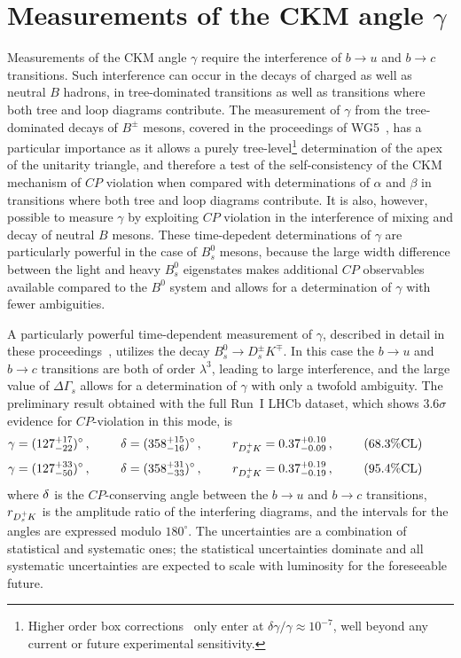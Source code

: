 \section{Measurements of the CKM angle $\gamma$}
\label{sec:gamma}
Measurements of the CKM angle $\gamma$ require the interference of $b\to u$ and $b\to c$ transitions.
Such interference can occur in the decays of charged as well as neutral $B$ hadrons, in tree-dominated
transitions as well as transitions where both tree and loop diagrams contribute.
The measurement of $\gamma$ from the tree-dominated decays of $B^\pm$ mesons, covered in the 
proceedings of WG5~\cite{WG5PROC}, has a particular importance as it allows a purely tree-level\footnote{Higher order box corrections~\cite{ZupanBrodGamma}
only enter at $\delta\gamma/\gamma \approx 10^{-7}$, well beyond any current or future experimental sensitivity.}
determination of the apex of the unitarity triangle, and therefore a test of the self-consistency of the CKM
mechanism of $CP$ violation when compared with determinations of $\alpha$ and $\beta$ in transitions where
both tree and loop diagrams contribute. It is also, however, possible to measure $\gamma$ by exploiting
$CP$ violation in the interference of mixing and decay of neutral $B$ mesons. These time-depedent determinations
of $\gamma$ are particularly powerful in the case of $B^0_s$ mesons, because the large width difference between
the light and heavy $B^0_s$ eigenstates makes additional $CP$ observables available compared
to the $B^0$ system and allows for a determination of $\gamma$ with fewer ambiguities. 

A particularly powerful time-dependent measurement of $\gamma$, described in detail in these proceedings~\cite{DSKPROC}, utilizes the decay $B^0_s \to D^\pm_s K^\mp$.
In this case the $b\to u$ and $b\to c$ transitions are both of order $\lambda^3$, leading to large interference, and
the large value of $\Delta\Gamma_s$ allows for a determination of $\gamma$ with only a twofold ambiguity. 
The preliminary result obtained with the full Run~I LHCb dataset, which shows $3.6\sigma$ evidence for $CP$-violation in this mode, is
\begin{equation}
\gamma      = (127_{-22}^{+17})^\circ\,,\phantom{space}
\delta = (  358_{-16}^{+15})^\circ\,,\phantom{space}
r_{{{D}^+_{s}}\hspace{-0.0625em} K}   = 0.37_{-0.09}^{+0.10}\,,\phantom{space}
(68.3\% \textrm{CL})\phantom{space}  
\end{equation}
\begin{equation}
\gamma      = (127_{-50}^{+33})^\circ\,,\phantom{space}
\delta = (  358_{-33}^{+31})^\circ\,,\phantom{space}
r_{{{D}^+_{s}}\hspace{-0.0625em} K}   = 0.37_{-0.19}^{+0.19}\,,\phantom{space}
(95.4\% \textrm{CL})\phantom{space}  
\end{equation}
where $\delta$ is the $CP$-conserving angle between the $b\to u$ and $b\to c$ transitions,
$r_{{{D}^+_{s}}\hspace{-0.0625em} K}$ is the amplitude ratio of the interfering diagrams, and the intervals for the angles are expressed modulo $180^\circ$.
The uncertainties are a combination of statistical and systematic ones; the statistical uncertainties dominate
and all systematic uncertainties are expected to scale with luminosity for the foreseeable future.

